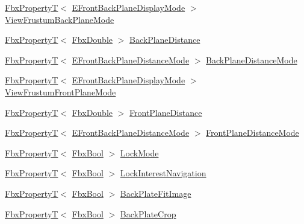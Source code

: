 \begin{DoxyCompactItemize}
\hyperlink{class_fbx_property_t}{Fbx\+PropertyT}$<$ \hyperlink{class_fbx_camera_ab7b9d3e546552049a79261a444f9b44a}{E\+Front\+Back\+Plane\+Display\+Mode} $>$ \hyperlink{class_fbx_camera_aee58e80280621397eccfaf92ac30e914}{View\+Frustum\+Back\+Plane\+Mode}
\item 
\hyperlink{class_fbx_property_t}{Fbx\+PropertyT}$<$ \hyperlink{fbxtypes_8h_a171e72a1c46fc15c1a6c9c31948c1c5b}{Fbx\+Double} $>$ \hyperlink{class_fbx_camera_ad54b41219ffef6383e75197300210f75}{Back\+Plane\+Distance}
\item 
\hyperlink{class_fbx_property_t}{Fbx\+PropertyT}$<$ \hyperlink{class_fbx_camera_a79e74898d117e741c3fbd10b1ef21c79}{E\+Front\+Back\+Plane\+Distance\+Mode} $>$ \hyperlink{class_fbx_camera_ae12c26a9d3be06c3e118cef04f596224}{Back\+Plane\+Distance\+Mode}
\item 
\hyperlink{class_fbx_property_t}{Fbx\+PropertyT}$<$ \hyperlink{class_fbx_camera_ab7b9d3e546552049a79261a444f9b44a}{E\+Front\+Back\+Plane\+Display\+Mode} $>$ \hyperlink{class_fbx_camera_a7d91e0645351854d02925da94d4cb924}{View\+Frustum\+Front\+Plane\+Mode}
\item 
\hyperlink{class_fbx_property_t}{Fbx\+PropertyT}$<$ \hyperlink{fbxtypes_8h_a171e72a1c46fc15c1a6c9c31948c1c5b}{Fbx\+Double} $>$ \hyperlink{class_fbx_camera_ab04e1fdc21ced2af3a372cb3c3c45295}{Front\+Plane\+Distance}
\item 
\hyperlink{class_fbx_property_t}{Fbx\+PropertyT}$<$ \hyperlink{class_fbx_camera_a79e74898d117e741c3fbd10b1ef21c79}{E\+Front\+Back\+Plane\+Distance\+Mode} $>$ \hyperlink{class_fbx_camera_ac8275a3d73371ebdd381bec957820b14}{Front\+Plane\+Distance\+Mode}
\item 
\hyperlink{class_fbx_property_t}{Fbx\+PropertyT}$<$ \hyperlink{fbxtypes_8h_a92e0562b2fe33e76a242f498b362262e}{Fbx\+Bool} $>$ \hyperlink{class_fbx_camera_aba8fcdabc543461794dcfbd683af1e76}{Lock\+Mode}
\item 
\hyperlink{class_fbx_property_t}{Fbx\+PropertyT}$<$ \hyperlink{fbxtypes_8h_a92e0562b2fe33e76a242f498b362262e}{Fbx\+Bool} $>$ \hyperlink{class_fbx_camera_a3060679e7b5d5c6ba05fd78f5bfee955}{Lock\+Interest\+Navigation}
\item 
\hyperlink{class_fbx_property_t}{Fbx\+PropertyT}$<$ \hyperlink{fbxtypes_8h_a92e0562b2fe33e76a242f498b362262e}{Fbx\+Bool} $>$ \hyperlink{class_fbx_camera_a60226ecc8df67faa201c77434eccd486}{Back\+Plate\+Fit\+Image}
\item 
\hyperlink{class_fbx_property_t}{Fbx\+PropertyT}$<$ \hyperlink{fbxtypes_8h_a92e0562b2fe33e76a242f498b362262e}{Fbx\+Bool} $>$ \hyperlink{class_fbx_camera_a3ec93b32631cf0b3bd2f41878c47a348}{Back\+Plate\+Crop}

\end{DoxyCompactItemize}
